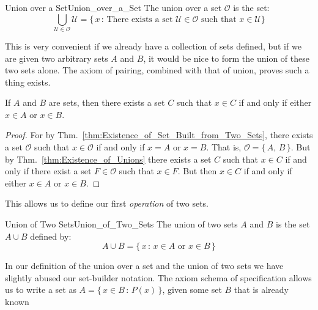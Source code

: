         \begin{fdefinition}{Union over a Set}{Union_over_a_Set}
            The union over a set $\mathcal{O}$ is the set:
            \begin{equation}
                \bigcup_{\mathcal{U}\in\mathcal{O}}\mathcal{U}
                =\big\{\,x\,:\,\textrm{There exists a set }
                         \mathcal{U}\in\mathcal{O}\textrm{ such that }
                         x\in\mathcal{U}\big\}
            \end{equation}
        \end{fdefinition}
        This is very convenient if we already have a collection of sets
        defined, but if we are given two arbitrary sets $A$ and $B$, it would
        be nice to form the union of these two sets alone. The axiom of
        pairing, combined with that of union, proves such a thing exists.
        \begin{theorem}
            If $A$ and $B$ are sets, then there exists a set $C$ such that
            $x\in{C}$ if and only if either $x\in{A}$ or $x\in{B}$.
        \end{theorem}
        \begin{proof}
            For by Thm.~\ref{thm:Existence_of_Set_Built_from_Two_Sets},
            there exists a set $\mathcal{O}$ such that $x\in\mathcal{O}$ if and
            only if $x=A$ or $x=B$. That is, $\mathcal{O}=\{\,A,\,B\,\}$.
            But by Thm.~\ref{thm:Existence_of_Unions} there exists a set
            $C$ such that $x\in{C}$ if and only if there exist a set
            $F\in\mathcal{O}$ such that $x\in{F}$. But then $x\in{C}$ if and
            only if either $x\in{A}$ or $x\in{B}$.
        \end{proof}
        This allows us to define our first \textit{operation} of two sets.
        \begin{fdefinition}{Union of Two Sets}{Union_of_Two_Sets}
            The union of two sets $A$ and $B$ is the set $A\cup{B}$ defined by:
            \begin{equation}
                A\cup{B}=\{\,x\,:\,x\in{A}\textrm{ or }x\in{B}\,\}
            \end{equation}
        \end{fdefinition}
        In our definition of the union over a set and the union of two sets
        we have slightly abused our set-builder notation. The axiom schema
        of specification allows us to write a set as
        $A=\{\,x\in{B}\,:\,P(x)\,\}$, given some set $B$ that is already known
